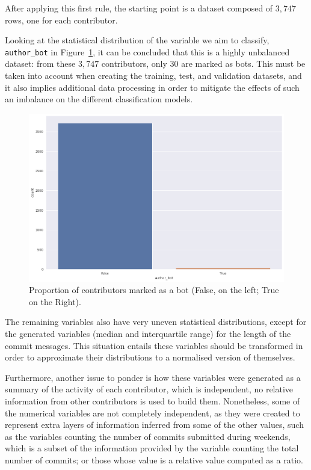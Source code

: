 \documentclass[a4paper, 12pt]{book}
\begin{document}
After applying this first rule, the starting point is a dataset composed of $3,747$ rows, one for each contributor.

Looking at the statistical distribution of the variable we aim to classify, \texttt{author\_bot} in Figure~\ref{fig:eda-contributors-bot-proportion}, it can be concluded that this is a highly unbalanced dataset: from these $3,747$ contributors, only $30$ are marked as bots. This must be taken into account when creating the training, test, and validation datasets, and it also implies additional data processing in order to mitigate the effects of such an imbalance on the different classification models.

\begin{figure}
 \centering
  \includegraphics[width=15cm, keepaspectratio]{img/authors_bots_proportion.png}
  \caption{Proportion of contributors marked as a bot (False, on the left; True on the Right).}
  \label{fig:eda-contributors-bot-proportion}
\end{figure}

The remaining variables also have very uneven statistical distributions, except for the generated variables (median and interquartile range) for the length of the commit messages. This situation entails these variables should be transformed in order to approximate their distributions to a normalised version of themselves.

Furthermore, another issue to ponder is how these variables were generated as a summary of the activity of each contributor, which is independent, no relative information from other contributors is used to build them. Nonetheless, some of the numerical variables are not completely independent, as they were created to represent extra layers of information inferred from some of the other values, such as the variables counting the number of commits submitted during weekends, which is a subset of the information provided by the variable counting the total number of commits; or those whose value is a relative value computed as a ratio.
\end{document}
